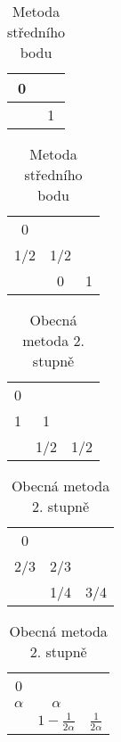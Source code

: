 \begin{table}[H]
    \parbox{.45\linewidth}{
        \centering
        \caption[Butcherova tabulka Eulerovy metody]{\textbf{Eulerova metoda}}
        \begin{tabular}{c | c}
            0 &   \\
            \hline
              & 1 \\
        \end{tabular}
    }
    \hfill
    \parbox{.45\linewidth}{
        \centering
        \caption[Butcherova tabulka metody středního bodu]{Metoda středního bodu}
        \begin{tabular}{c | c c}
            0   &         \\
            1/2 & 1/2     \\
            \hline
                & 0   & 1 \\
        \end{tabular}
    }
\end{table}
\begin{table}[H]
    \parbox{.3\linewidth}{
        \centering
        \caption[Butcherova tabulka Heunovy metody]{Heunova metoda}
        \begin{tabular}{c | c c}
            0 &           \\
            1 & 1         \\
            \hline
              & 1/2 & 1/2 \\
        \end{tabular}
    }
    \hfill
    \parbox{.3\linewidth}{
        \centering
        \caption[Butcherova tabulka Ralstonovy metody]{Ralstonova metoda}
        \begin{tabular}{c | c c}
            0   &           \\
            2/3 & 2/3       \\
            \hline
                & 1/4 & 3/4 \\
        \end{tabular}
    }
    \hfill
    \parbox{.3\linewidth}{
        \centering
        \caption[Butcherova tabulka obecné metody 2. stupně]{Obecná metoda 2. stupně}
        \begin{tabular}{c | c c}
            0        &                                               \\
            $\alpha$ & $\alpha$                                      \\
            \hline
                     & $1 - \frac{1}{2\alpha}$ & $\frac{1}{2\alpha}$ \\
        \end{tabular}
    }
\end{table}


